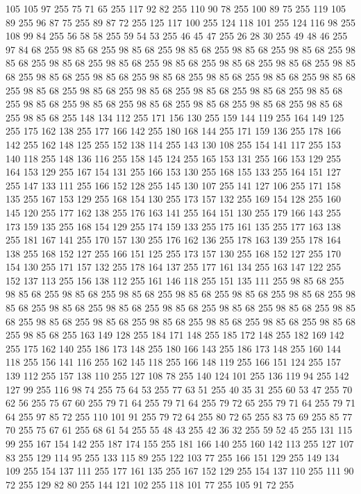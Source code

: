 105 105 97 255 75 71 65 255 117 92 82 255 110 90 78 255 100 89 75 255 119 105 89 255 96 87 75 255 89 87 72 255 125 117 100 255 124 118 101 255 124 116 98 255 108 99 84 255 56 58 58 255 59 54 53 255 46 45 47 255 26 28 30 255 49 48 46 255 97 84 68 255 98 85 68 255 98 85 68 255 98 85 68 255 98 85 68 255 98 85 68 255 98 85 68 255 98 85 68 255 98 85 68 255 98 85 68 255 98 85 68 255 98 85 68 255 98 85 68 255 98 85 68 255 98 85 68 255 98 85 68 255 98 85 68 255 98 85 68 255 98 85 68 255 98 85 68 255 98 85 68 255 98 85 68 255 98 85 68 255 98 85 68 255 98 85 68 255 98 85 68 255 98 85 68 255 98 85 68 255 98 85 68 255 98 85 68 255 98 85 68 255 98 85 68 255 148 134 112 255 171 156 130 255 159 144 119 255 164 149 125 255 175 162 138 255 177 166 142 255 180 168 144 255 171 159 136 255 178 166 142 255 162 148 125 255 152 138 114 255 143 130 108 255 154 141 117 255 153 140 118 255 148 136 116 255
158 145 124 255 165 153 131 255 166 153 129 255 164 153 129 255 167 154 131 255 166 153 130 255 168 155 133 255 164 151 127 255 147 133 111 255 166 152 128 255 145 130 107 255 141 127 106 255 171 158 135 255 167 153 129 255 168 154 130 255 173 157 132 255 169 154 128 255 160 145 120 255 177 162 138 255 176 163 141 255 164 151 130 255 179 166 143 255 173 159 135 255 168 154 129 255 174 159 133 255 175 161 135 255 177 163 138 255 181 167 141 255 170 157 130 255 176 162 136 255 178 163 139 255 178 164 138 255 168 152 127 255 166 151 125 255 173 157 130 255 168 152 127 255 170 154 130 255 171 157 132 255 178 164 137 255 177 161 134 255 163 147 122 255 152 137 113 255 156 138 112 255 161 146 118 255 151 135 111 255 98 85 68 255 98 85 68 255 98 85 68 255 98 85 68 255 98 85 68 255 98 85 68 255 98 85 68 255 98 85 68 255 98 85 68 255 98 85 68 255 98 85 68 255 98 85 68 255 98 85 68 255 98 85 68 255 98 85 68 255 98 85 68 255 98 85 68 255 98 85 68 255 98 85 68 255
98 85 68 255 98 85 68 255 163 149 128 255 184 171 148 255 185 172 148 255 182 169 142 255 175 162 140 255 186 173 148 255 180 166 143 255 186 173 148 255 160 144 118 255 156 141 116 255 162 145 118 255 166 148 119 255 166 151 124 255 157 139 112 255 157 138 110 255 127 108 78 255 140 124 101 255 136 119 94 255 142 127 99 255 116 98 74 255 75 64 53 255 77 63 51 255 40 35 31 255 60 53 47 255 70 62 56 255 75 67 60 255 79 71 64 255 79 71 64 255 79 72 65 255 79 71 64 255 79 71 64 255 97 85 72 255 110 101 91 255 79 72 64 255 80 72 65 255 83 75 69 255 85 77 70 255 75 67 61 255 68 61 54 255 55 48 43 255 42 36 32 255 59 52 45 255 131 115 99 255 167 154 142 255 187 174 155 255 181 166 140 255 160 142 113 255 127 107 83 255 129 114 95 255 133 115 89 255 122 103 77 255 166 151 129 255 149 134 109 255 154 137 111 255 177 161 135 255 167 152 129 255 154 137 110 255 111 90 72 255 129 82 80 255 144 121 102 255 118 101 77 255 105 91 72 255
